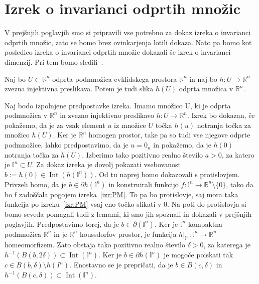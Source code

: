 \documentclass[mat1]{fmfdelo}
\newcommand{\R}{\mathbb R}
\DeclareMathOperator{\Int}{Int}
\newcommand{\I}{\mathbb I}
\newcommand{\0}{\underline{0}}
\begin{document}
\section{Izrek o invarianci odprtih množic}\label{raz:ioiom}
V prejšnjih poglavjih smo si pripravili vse potrebno za dokaz izreka o invarianci odprtih množic, zato se bomo brez ovinkarjenja lotili dokaza. Nato pa bomo kot posledico izreka o invarianci odprtih množic dokazali še izrek o invarianci dimenzij. Pri tem bomo sledili~\cite{Kulpa}.
%
\begin{izrek}\label{izr:main-theorem}
Naj bo $U \subset \R^n$ odprta podmnožica evklidskega prostora $\R^n$ in naj bo $h : U \rightarrow \R^n$ zvezna injektivna preslikava.
Potem je tudi slika $h(U)$ odprta množica v $\R^n$.
\end{izrek}
%
\begin{dokaz}
Naj bodo izpolnjene predpostavke izreka. Imamo množico U, ki je odprta podmnožica v $\R^n$ in zvezno injektivno preslikavo $h : U \rightarrow \R^n$. Izrek bo dokazan, če pokažemo, da je za vsak element $u$ iz množice $U$ točka $h(u)$ notranja točka za množico $h(U)$. Ker je $\R^n$ homogen prostor, take pa so tudi vse njegove odprte podmnožice, lahko predpostavimo, da je $u = 0_n$ in pokažemo, da je $h(0)$ notranja točka za $h(U)$. Izberimo tako pozitivno realno število $a > 0$, za katero je $\I^n \subset U$. Za dokaz izreka  je dovolj pokazati vsebovanost $b := h(0) \in \Int(h(\I^n))$. Od tu naprej bomo dokazovali s protislovjem. Privzeli bomo, da je $b \in \partial h(\I^n)$ in konstruirali funkcijo $f : \I^n \to \R^n \setminus \{ 0 \}$, tako da bo f zadoščala pogojem izreka~\ref{izr:PM}. To pa bo protislovje, saj mora taka funkcija po izreku~\ref{izr:PM} vsaj eno točko slikati v $0$. Na poti do protislovja si bomo seveda pomagali tudi z lemami, ki smo jih spoznali in dokazali v prejšnjih poglavjih. Predpostavimo torej, da je $b \in \partial (\I^n)$. Ker je $\I^n$ kompaktna podmnožica $\R^n$ in je $\R^n$ houssdorfov prostor, je funkcija $h|_{\I^n} : \I^n \to \R^n$ homeomorfizem. Zato obstaja tako pozitivno realno število $\delta > 0$, za katerega je $h^{-1}(B(b, 2 \delta)) \subset \Int(\I^n)$. Ker je $b \in \partial h(\I^n)$ je mogoče poiskati tak $c \in B(b, \delta) \setminus h(I^n)$. Enostavno se je prepričati, da je $b \in B(c, \delta)$ in $h^{-1} (B(c, \delta)) \subset \Int (\I^n)$.


\end{dokaz}
\end{document}
